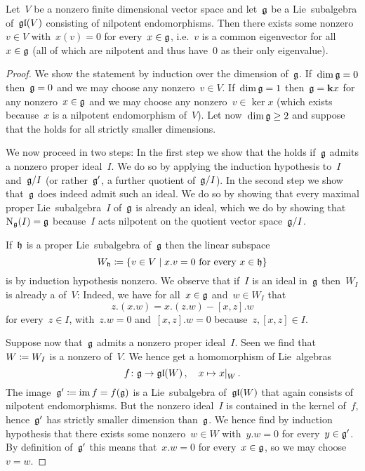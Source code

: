 \begin{proposition}
  \label{common eigenvector for nilpotent Lie algebras}
  Let~$V$ be a nonzero finite dimensional vector space and let~$\glie$ be a Lie~subalgebra of~$\mathfrak{gl}(V)$ consisting of nilpotent endomorphisms.
  Then there exists some nonzero~$v \in V$ with~$x(v) = 0$ for every~$x \in \mathfrak{g}$, i.e.~$v$ is a common eigenvector for all~$x \in \mathfrak{g}$ (all of which are nilpotent and thus have~$0$ as their only eigenvalue).
\end{proposition}


\begin{proof}
  We show the statement by induction over the dimension of~$\glie$.
  If~$\dim \mathfrak{g} = 0$ then~$\mathfrak{g} = 0$ and we may choose any nonzero~$v \in V$.
  If~$\dim \mathfrak{g} = 1$ then~$\mathfrak{g} = \mathbf{k} x$ for any nonzero~$x \in \mathfrak{g}$ and we may choose any nonzero~$v \in \ker x$ (which exists because~$x$ is a nilpotent endomorphism of~$V$).
  Let now~$\dim \mathfrak{g} \geq 2$ and suppose that the  holds for all strictly smaller dimensions.
  
  We now proceed in two steps:
  In the first step we show that the  holds if~$\glie$ admits a nonzero proper ideal~$I$.
  We do so by applying the induction hypothesis to~$I$ and~$\mathfrak{g}/I$ (or rather~$\mathfrak{g}'$, a further quotient of~$\mathfrak{g}/I$).
  In the second step we show that~$\glie$ does indeed admit such an ideal.
  We do so by showing that every maximal proper Lie~subalgebra~$I$ of~$\glie$ is already an ideal, which we do by showing that~$\operatorname{N}_{\mathfrak{g}}(I) = \mathfrak{g}$ because~$I$ acts nilpotent on the quotient vector space~$\mathfrak{g}/I$.
  
  If~$\mathfrak{h}$ is a proper Lie~subalgebra of~$\glie$ then the linear subspace
  \[
    W_\hlie
    \defined
    \{
      v \in V
    \suchthat
      \text{$x.v = 0$ for every~$x \in \hlie$}
    \}
  \]
  is by induction hypothesis nonzero.
  We observe that if~$I$ is an ideal in~$\glie$ then~$W_I$ is already a {\subrepresentation{$\glie$}} of~$V$:
  Indeed, we have for all~$x \in \mathfrak{g}$ and~$w \in W_I$ that
  \[
    z.(x.w)
    =
    x.(z.w) - [x,z].w
  \]
  for every~$z \in I$, with~$z.w = 0$ and~$[x,z].w = 0$ because~$z, [x,z] \in I$.
  
  Suppose now that~$\glie$ admits a nonzero proper ideal~$I$.
  Seen we find that~$W \coloneqq W_I$ is a nonzero {\subrepresentation{$\glie$}} of~$V$.
  We hence get a homomorphism of Lie~algebras
  \[
    f
    \colon
    \glie
    \to
    \gllie(W) \,,
    \quad
    x
    \mapsto
    \restrict{x}{W} \,.
  \]
  The image~$\mathfrak{g}' \coloneqq \operatorname{im} f = f(\mathfrak{g})$ is a Lie~subalgebra of~$\mathfrak{gl}(W)$ that again consists of nilpotent endomorphisms.
  But the nonzero ideal~$I$ is contained in the kernel of~$f$, hence~$\mathfrak{g}'$ has strictly smaller dimension than~$\glie$.
  We hence find by induction hypothesis that there exists some nonzero~$w \in W$ with~$y.w = 0$ for every~$y \in \mathfrak{g}'$.
  By definition of~$\mathfrak{g}'$ this means that~$x.w = 0$ for every~$x \in \mathfrak{g}$, so we may choose~$v = w$.
  

\end{proof}
